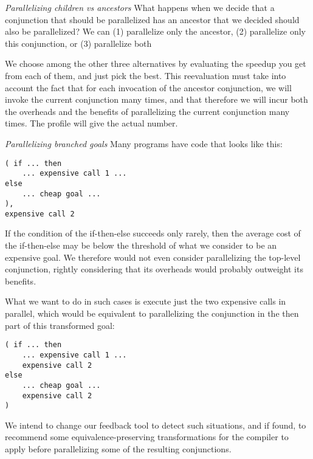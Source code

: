 
\emph{Parallelizing children vs ancestors}
What happens when we decide that a conjunction that should be parallelized
has an ancestor that we decided should also be parallelized?
We can
(1) parallelize only the ancestor,
(2) parallelize only this conjunction, or
(3) parallelize both


We choose among the other three alternatives
by evaluating the speedup you get from each of them, and just pick the best.
This reevaluation must take into account
the fact that for each invocation of the ancestor conjunction,
we will invoke the current conjunction many times,
and that therefore we will incur both the overheads and the benefits
of parallelizing the current conjunction many times.
The profile will give the actual number.



\emph{Parallelizing branched goals}
Many programs have code that looks like this:
\begin{verbatim}
( if ... then
    ... expensive call 1 ...
else
    ... cheap goal ...
),
expensive call 2
\end{verbatim}
If the condition of the if-then-else succeeds only rarely,
then the average cost of the if-then-else
may be below the threshold of what we consider to be an expensive goal.
We therefore would not even consider
parallelizing the top-level conjunction,
rightly considering that its overheads would probably outweight its benefits.

What we want to do in such cases
is execute just the two expensive calls in parallel,
which would be equivalent to parallelizing the conjunction
in the then part of this transformed goal:
\begin{verbatim}
( if ... then
    ... expensive call 1 ...
    expensive call 2
else
    ... cheap goal ...
    expensive call 2
)
\end{verbatim}
We intend to change our feedback tool to detect such situations,
and if found, to recommend
some equivalence-preserving transformations for the compiler to apply
before parallelizing some of the resulting conjunctions.

